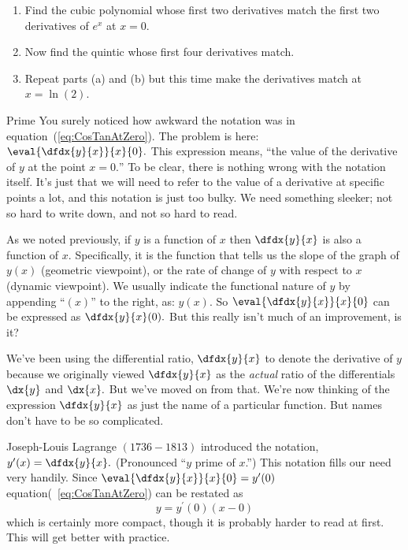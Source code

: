 \begin{Digression}
\begin{embeddedproblem}{}
  \begin{enumerate}[label={\bf{}(\alph*)}]
  \item Find the cubic polynomial whose first two derivatives match
    the first two derivatives of $e^x$ at $x=0.$
  \item Now find the quintic whose
    first four derivatives match.
  \item  Repeat parts (a) and (b) but this time make the derivatives
    match at $x=\ln(2).$
  \end{enumerate}
\end{embeddedproblem}
\end{Digression}

\begin{mynotation}{Prime}
  You surely noticed how awkward the notation was in
  equation~(\ref{eq:CosTanAtZero}). The problem is here:
  $\eval{\dfdx{y}{x}}{x}{0}.$ This expression means, ``the value
  of the derivative of $y$ at the point $x=0.$'' To be clear, there is
  nothing wrong with the notation itself. It's just that we will need
  to refer to the value of a derivative at specific points a lot, and
  this notation is just too bulky. We need something sleeker; not so
  hard to write down, and not so hard to read.
  
  As we noted previously, if $y$ is a function of $x$ then
  $\dfdx{y}{x}$ is also a function of $x.$ Specifically, it is the
  function that tells us the slope of the graph of $y(x)$ (geometric
  viewpoint), or the rate of change of $y$ with respect to $x$
  (dynamic viewpoint). We usually indicate the functional nature of
  $y$ by appending ``$(x)$'' to the right, as: $y(x).$ So
  $\eval{\dfdx{y}{x}}{x}{0}$ can be expressed as $\dfdx{y}{x}(0).$
  But this really isn't much of an improvement, is it?

  We've been
  using the differential ratio, $\dfdx{y}{x}$  to denote the
  derivative of $y$ because we originally viewed
  $\dfdx{y}{x}$ as the \emph{actual} ratio of the differentials
  $\dx{y}$ and $\dx{x}.$ But we've moved on from that. We're now
  thinking of the expression $\dfdx{y}{x}$ as just the name of a
  particular function. But names don't have to be so complicated.

  Joseph-Louis Lagrange $(1736-1813)$ introduced the notation,
  $y^\prime(x) = \dfdx{y}{x}.$ (Pronounced ``$y$ prime of $x$.'')
  This notation fills our need very handily. Since
  $ \eval{\dfdx{y}{x}}{x}{0} = y^\prime(0)$ equation(~\ref{eq:CosTanAtZero}) can
  be restated as
  $$
  y=y^\prime(0)(x-0)
  $$
  which is certainly more compact, though it is probably harder to
  read at first. This will get better with practice.


\end{mynotation}

